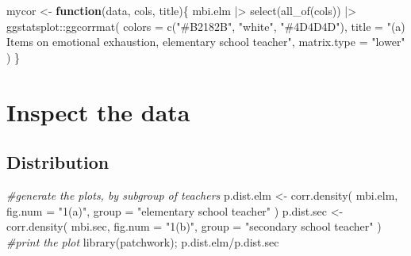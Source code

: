\documentclass[
]{article}
\newenvironment{Shaded}{\begin{snugshade}}{\end{snugshade}}
\newcommand{\AttributeTok}[1]{\textcolor[rgb]{0.77,0.63,0.00}{#1}}
\newcommand{\CommentTok}[1]{\textcolor[rgb]{0.56,0.35,0.01}{\textit{#1}}}
\newcommand{\ControlFlowTok}[1]{\textcolor[rgb]{0.13,0.29,0.53}{\textbf{#1}}}
\newcommand{\FunctionTok}[1]{\textcolor[rgb]{0.00,0.00,0.00}{#1}}
\newcommand{\NormalTok}[1]{#1}
\newcommand{\OtherTok}[1]{\textcolor[rgb]{0.56,0.35,0.01}{#1}}
\newcommand{\SpecialCharTok}[1]{\textcolor[rgb]{0.00,0.00,0.00}{#1}}
\newcommand{\StringTok}[1]{\textcolor[rgb]{0.31,0.60,0.02}{#1}}
\begin{document}
\begin{Shaded}
\begin{Highlighting}[]
\NormalTok{mycor }\OtherTok{\textless{}{-}} 
  \ControlFlowTok{function}\NormalTok{(data, cols, title)\{}
\NormalTok{  mbi.elm }\SpecialCharTok{|\textgreater{}} 
      \FunctionTok{select}\NormalTok{(}\FunctionTok{all\_of}\NormalTok{(cols)) }\SpecialCharTok{|\textgreater{}} 
\NormalTok{      ggstatsplot}\SpecialCharTok{::}\FunctionTok{ggcorrmat}\NormalTok{(}
        \AttributeTok{colors =} \FunctionTok{c}\NormalTok{(}\StringTok{"\#B2182B"}\NormalTok{, }\StringTok{"white"}\NormalTok{, }\StringTok{"\#4D4D4D"}\NormalTok{),}
        \AttributeTok{title =} \StringTok{"(a) Items on emotional exhaustion, }
\StringTok{        elementary school teacher"}\NormalTok{,}
        \AttributeTok{matrix.type  =} \StringTok{"lower"}
\NormalTok{      )}
\NormalTok{    \}}
\end{Highlighting}
\end{Shaded}

\hypertarget{inspect-the-data}{%
\section{Inspect the data}\label{inspect-the-data}}

\hypertarget{distribution}{%
\subsection{Distribution}\label{distribution}}

\begin{Shaded}
\begin{Highlighting}[]
\CommentTok{\#generate the plots, by subgroup of teachers}
\NormalTok{p.dist.elm }\OtherTok{\textless{}{-}} 
  \FunctionTok{corr.density}\NormalTok{(}
\NormalTok{    mbi.elm, }
    \AttributeTok{fig.num =} \StringTok{"1(a)"}\NormalTok{, }
    \AttributeTok{group =} \StringTok{"elementary school teacher"}
\NormalTok{    )}
\NormalTok{p.dist.sec }\OtherTok{\textless{}{-}} 
  \FunctionTok{corr.density}\NormalTok{(}
\NormalTok{    mbi.sec, }
    \AttributeTok{fig.num =} \StringTok{"1(b)"}\NormalTok{,}
    \AttributeTok{group =} \StringTok{"secondary school teacher"}
\NormalTok{    )}
\CommentTok{\#print the plot}
\FunctionTok{library}\NormalTok{(patchwork); p.dist.elm}\SpecialCharTok{/}\NormalTok{p.dist.sec}
\end{Highlighting}
\end{Shaded}
\end{document}
